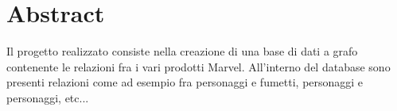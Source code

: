\documentclass[
12pt, %
a4paper, %
oneside, %
headinclude,footinclude, %
BCOR5mm, %
]{scrartcl}
\title{\normalfont\spacedallcaps{Article Title}} %
\author{\spacedlowsmallcaps{Fabrizio Cominetti, Davide Abete, Ruben Agazzi}} %
\date{} %
\begin{document}

\renewcommand{\sectionmark}[1]{\markright{\spacedlowsmallcaps{#1}}} %
\lehead{\mbox{\llap{\small\thepage\kern1em\color{halfgray} \vline}\color{halfgray}\hspace{0.5em}\rightmark\hfil}} %

\pagestyle{scrheadings} %


\maketitle %

\setcounter{tocdepth}{2} %

\tableofcontents %



\section*{Abstract} %

Il progetto realizzato consiste nella creazione di una base di dati a grafo contenente le relazioni fra i vari prodotti Marvel. All'interno del database sono presenti relazioni come ad esempio fra personaggi e fumetti, personaggi e personaggi, etc... 

\end{document}
